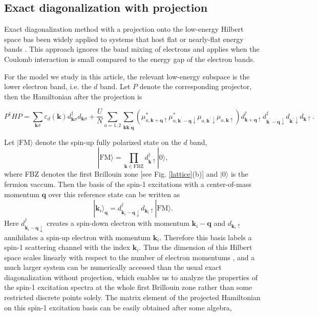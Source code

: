 \documentclass[amsmath,superscriptaddress,showpacs,aps,prb,twocolumn]{revtex4-1}
\begin{document}
\subsection{Exact diagonalization with projection}\label{exact_diag_proj}
\par Exact diagonalization method with a projection onto the low-energy Hilbert space bas been widely applied to systems that host flat or nearly-flat energy bands \cite{NSCM_PRL2011,RB_PRX2011,NSRCM_PRB2011,SGDL_PRB2018,NSRCM_PRL2012,DG_PRB2015}. This approach ignores the band mixing of electrons and applies when the Coulomb interaction is small compared to the energy gap of the electron bands.

\par For the model we study in this article, the relevant low-energy subspace is the lower electron band, i.e. the $d$ band. Let $P$ denote the corresponding projector, then the Hamiltonian after the projection is
\begin{widetext}
\begin{equation}
P^\dagger HP=\sum_{\mathbf{k}\sigma}\varepsilon_d(\mathbf{k})d^{\dagger}_{\mathbf{k}\sigma}d_{\mathbf{k}\sigma}
+\frac{U}{N}\sum_{a=1,2}\sum_{\mathbf{k}\mathbf{k}^{\prime}\mathbf{q}}
(\mu^{\ast}_{a,\mathbf{k}+\mathbf{q}\uparrow}\mu^{\ast}_{a,\mathbf{k}^{\prime}-\mathbf{q}\downarrow}\mu_{a,\mathbf{k}^{\prime}\downarrow}\mu_{a,\mathbf{k}\uparrow})
d^{\dagger}_{\mathbf{k}+\mathbf{q}\uparrow}d^{\dagger}_{\mathbf{k}^{\prime}-\mathbf{q}\downarrow}d_{\mathbf{k}^{\prime}\downarrow}d_{\mathbf{k}\uparrow}.
\end{equation}
\end{widetext}
Let $|\text{FM}\rangle$ denote the spin-up fully polarized state on the $d$ band,
\begin{equation}
|\text{FM}\rangle=\prod_{\mathbf{k}\in \text{FBZ}}d^{\dagger}_{\mathbf{k}\uparrow}|\text{0}\rangle,
\end{equation}
where FBZ denotes the first Brillouin zone [see Fig. \ref{lattice}(b)] and $|0\rangle$ is the fermion vaccum. Then the basis of the spin-1 excitations with a center-of-mass momentum $\mathbf{q}$ over this reference state can be written as
\begin{equation}
|\mathbf{k}_i\rangle_\mathbf{q}=d^{\dagger}_{\mathbf{k}_{i}-\mathbf{q}\downarrow}d_{\mathbf{k}_{i}\uparrow}|\text{FM}\rangle.
\end{equation}
Here $d^{\dagger}_{\mathbf{k}_{i}-\mathbf{q}\downarrow}$ creates a spin-down electron with momentum $\mathbf{k}_{i}-\mathbf{q}$ and $d_{\mathbf{k}_{i}\uparrow}$ annihilates a spin-up electron with momentum $\mathbf{k}_{i}$. Therefore this basis labels a spin-1 scattering channel with the index $\mathbf{k}_{i}$. Thus the dimension of this Hilbert space scales linearly with respect to the number of electron momentums \cite{SGDL_PRB2018}, and a much larger system can be numerically accessed than the usual exact diagonalization without projection, which enables us to analyze the properties of the spin-1 excitation spectra at the whole first Brillouin zone rather than some restricted discrete points solely. The matrix element of the projected Hamiltonian on this spin-1 excitation basis can be easily obtained after some algebra,
\end{document}
